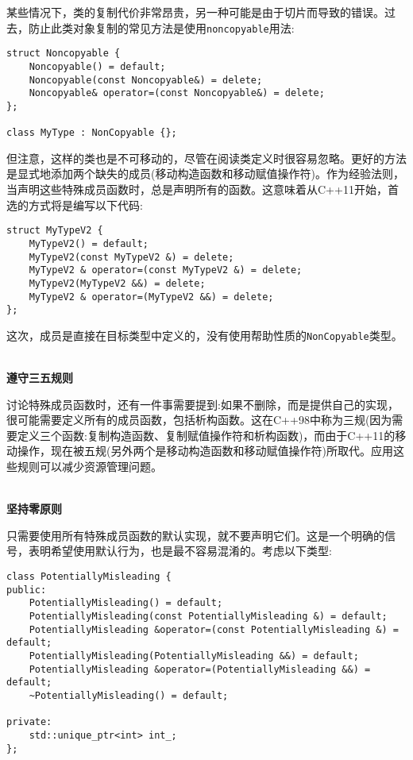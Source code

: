 某些情况下，类的复制代价非常昂贵，另一种可能是由于切片而导致的错误。过去，防止此类对象复制的常见方法是使用\texttt{noncopyable}用法:

\begin{lstlisting}[style=styleCXX]
struct Noncopyable {
	Noncopyable() = default;
	Noncopyable(const Noncopyable&) = delete;
	Noncopyable& operator=(const Noncopyable&) = delete;
};

class MyType : NonCopyable {};
\end{lstlisting}

但注意，这样的类也是不可移动的，尽管在阅读类定义时很容易忽略。更好的方法是显式地添加两个缺失的成员(移动构造函数和移动赋值操作符)。作为经验法则，当声明这些特殊成员函数时，总是声明所有的函数。这意味着从C++11开始，首选的方式将是编写以下代码:

\begin{lstlisting}[style=styleCXX]
struct MyTypeV2 {
	MyTypeV2() = default;
	MyTypeV2(const MyTypeV2 &) = delete;
	MyTypeV2 & operator=(const MyTypeV2 &) = delete;
	MyTypeV2(MyTypeV2 &&) = delete;
	MyTypeV2 & operator=(MyTypeV2 &&) = delete;
};
\end{lstlisting}

这次，成员是直接在目标类型中定义的，没有使用帮助性质的\texttt{NonCopyable}类型。

\hspace*{\fill} \\ %
\noindent
\textbf{遵守三五规则}

讨论特殊成员函数时，还有一件事需要提到:如果不删除，而是提供自己的实现，很可能需要定义所有的成员函数，包括析构函数。这在C++98中称为三规(因为需要定义三个函数:复制构造函数、复制赋值操作符和析构函数)，而由于C++11的移动操作，现在被五规(另外两个是移动构造函数和移动赋值操作符)所取代。应用这些规则可以减少资源管理问题。

\hspace*{\fill} \\ %
\noindent
\textbf{坚持零原则}

只需要使用所有特殊成员函数的默认实现，就不要声明它们。这是一个明确的信号，表明希望使用默认行为，也是最不容易混淆的。考虑以下类型:

\begin{lstlisting}[style=styleCXX]
class PotentiallyMisleading {
public:
	PotentiallyMisleading() = default;
	PotentiallyMisleading(const PotentiallyMisleading &) = default;
	PotentiallyMisleading &operator=(const PotentiallyMisleading &) = default;
	PotentiallyMisleading(PotentiallyMisleading &&) = default;
	PotentiallyMisleading &operator=(PotentiallyMisleading &&) = default;
	~PotentiallyMisleading() = default;
	
private:
	std::unique_ptr<int> int_;
};
\end{lstlisting}

